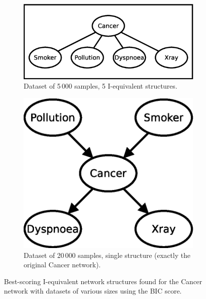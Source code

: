 \documentclass[english,cover]{fitthesis} %
\begin{document}
\begin{figure}[ht]
    \begin{subfigure}[b]{0.45\linewidth}
        \centering
        \includegraphics[scale=0.4]{fig/structure-learning-cancer-5000}
        \caption{Dataset of 5\,000 samples, 5 I-equivalent structures.}
        \label{fig:structure-learning-cancer-5000}
    \end{subfigure}
    \quad
    \begin{subfigure}[b]{0.45\linewidth}
        \centering
        \includegraphics[scale=0.4]{fig/structure-learning-cancer-20000}
        \caption{Dataset of 20\,000 samples, single structure (exactly the original Cancer network).}
        \label{fig:structure-learning-cancer-20000}
    \end{subfigure}
    \caption{Best-scoring I-equivalent network structures found for the Cancer network with datasets of various sizes using the BIC score.}
    \label{fig:structure-learning-cancer}
\end{figure}
\end{document}

